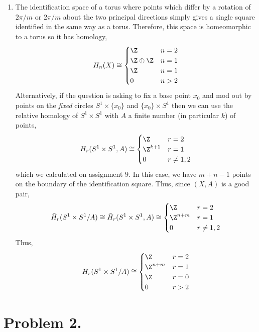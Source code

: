 \documentclass[12pt]{extarticle}
\begin{document}
\begin{enumerate}
\item The identification space of a torus where points which differ by a rotation of $2 \pi / m$ or $2 \pi / m$ about the two principal directions simply gives a single square identified in the same way as a torus. Therefore, this space is homeomorphic to a torus so it has homology,
\[ H_n(X) \cong 
\begin{cases}
\Z & n = 2
\\
\Z \oplus \Z & n = 1
\\
\Z & n = 1
\\
0 & n > 2
\end{cases} \]
Alternatively, if the question is asking to fix a base point $x_0$ and mod out by points on the \textit{fixed} circles $S^1 \times \{ x_0 \}$ and $\{ x_0 \} \times S^1$ then we can use the relative homology of $S^1 \times S^1$ with $A$ a finite number (in particular $k$) of points,
\[ H_r(S^1 \times S^1, A) \cong \begin{cases}
\Z & r = 2 \\
\Z^{k+1} & r = 1 \\
0 & r \neq 1, 2
\end{cases} \]
which we calculated on assignment $9$. In this case, we have $m + n  - 1$ points on the boundary of the identification square. Thus, since $(X, A)$ is a good pair,
\[ \tilde{H}_r(S^1 \times S^1/A) \cong \tilde{H}_r(S^1 \times S^1, A) \cong \begin{cases}
\Z & r = 2 
\\
\Z^{n + m} & r = 1 
\\
0 & r \neq 1, 2
\end{cases} \]
Thus,
\[ H_r(S^1 \times S^1/A) \cong 
\begin{cases}
\Z & r = 2 \\
\Z^{n + m} & r = 1 
\\
\Z & r = 0
\\
0 & r > 2
\end{cases} \]

\end{enumerate}

\section*{Problem 2.}
\end{document}
